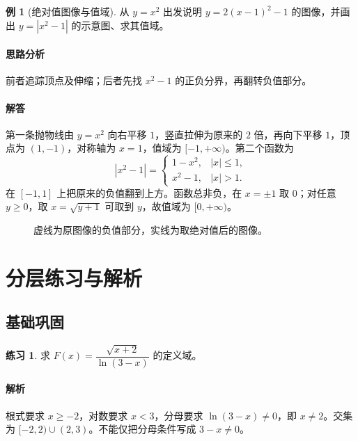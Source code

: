 \documentclass[UTF8,fontset=fandol,12pt,oneside,openany]{ctexrep}
\theoremstyle{definition}
\newtheorem{example}{例}[chapter]
\newtheorem{exercise}{练习}[chapter]
\begin{document}
\begin{example}[绝对值图像与值域]
从 $y=x^2$ 出发说明 $y=2(x-1)^2-1$ 的图像，并画出 $y=|x^2-1|$ 的示意图、求其值域。
\end{example}
\paragraph{思路分析} 前者追踪顶点及伸缩；后者先找 $x^2-1$ 的正负分界，再翻转负值部分。
\paragraph{解答} 第一条抛物线由 $y=x^2$ 向右平移 $1$，竖直拉伸为原来的 $2$ 倍，再向下平移 $1$，顶点为 $(1,-1)$，对称轴为 $x=1$，值域为 $[-1,+\infty)$。第二个函数为
\[
 |x^2-1|=\begin{cases}1-x^2,&|x|\le1,\\x^2-1,&|x|>1.\end{cases}
\]
在 $[-1,1]$ 上把原来的负值翻到上方。函数总非负，在 $x=\pm1$ 取 $0$；对任意 $y\ge0$，取 $x=\sqrt{y+1}$ 可取到 $y$，故值域为 $[0,+\infty)$。
\begin{figure}[htbp]
\centering
{}
\caption{虚线为原图像的负值部分，实线为取绝对值后的图像。}
\label{lec:01:fig:absolute}
\end{figure}

\section{分层练习与解析}
\label{lec:01:exercises}
\subsection{基础巩固}
\begin{exercise}
求 $F(x)=\dfrac{\sqrt{x+2}}{\ln(3-x)}$ 的定义域。
\end{exercise}
\paragraph{解析} 根式要求 $x\ge-2$，对数要求 $x<3$，分母要求 $\ln(3-x)\ne0$，即 $x\ne2$。交集为 $[-2,2)\cup(2,3)$。不能仅把分母条件写成 $3-x\ne0$。
\end{document}
